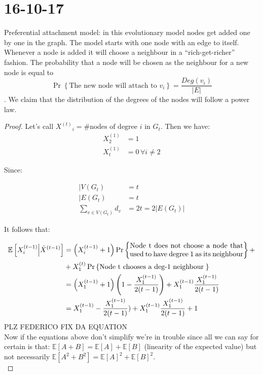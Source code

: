 \documentclass[]{article}
\begin{document}
\section{16-10-17}
Preferential attachment model: in this evolutionary model nodes get added one by one in the graph. The model starts with one node with an edge to itself. Whenever a node is added it will choose a neighbour in a ``rich-get-richer'' fashion. The probability that a node will be chosen as the neighbour for a new node is equal to \[\Pr\left\{\text{The new node will attach to }v_i\right\} = \frac{Deg(v_i)}{|E|}\]. We claim that the distribution of the degrees of the nodes will follow a power law.\\
\begin{proof}

Let's call ${{X}^{(t)}}_i = \text{\# nodes of degree } i \text{ in }G_t$. Then we have:
	\begin{align*}
		X_2^{(1)} &= 1\\
		X_t^{(1)} &= 0\, \forall i\neq 2
	\end{align*}
	
	Since:
	
		\begin{align*}
	|V(G_t) &= t\\
	|E(G_t) &= t\\
	\sum_{v \in V(G_t)}^{} d_v &= 2t = 2|E(G_t)|
			\end{align*}
			
It follows that:

		\begin{align*}
			\mathbb{E}\left[X_i^{(t-1)} \middle| \bar{X}^{(t-1)}\right] &=\left(X_i^{(t-1)} + 1\right)\Pr\left\{\parbox{16em}{Node t does not choose a node that used to have degree 1 as its neighbour}\right\} +\\
			&+ X_1^{(t)} \Pr\left\{\parbox{15em}{Node t chooses a deg-1 neighbour}\right\}\\
			&= \left(X_1^{(t-1)} + 1\right)\left(1-\frac{X_1^{(t-1)}}{2(t-1)}\right) + X_1^{(t-1)} \frac{X_1^{(t-1)}}{2(t-1)}\\
			&= X_1^{(t-1)} - \frac{X_1^{(t-1)}}{2(t-1)}) + X_1^{(t-1)} \frac{ X_1^{(t-1)} }{2(t-1)}+1
		\end{align*}
PLZ FEDERICO FIX DA EQUATION\\

Now if the equations above don't simplify we're in trouble since all we can say for certain is that: $\mathbb{E}[A+B] = \mathbb{E}[A] + \mathbb{E}[B]$ (linearity of the expected value) but not necessarily $\mathbb{E}[A^2+B^2] = \mathbb{E}[A]^2 + \mathbb{E}[B]^2$.\\



\end{proof}
\end{document}
